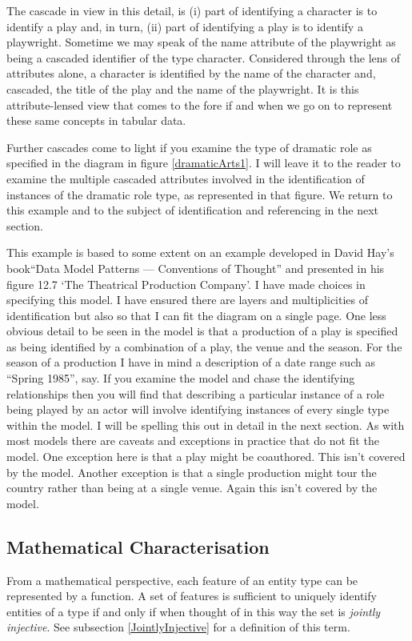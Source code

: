 The cascade in view in this detail, is 
(i)  part of identifying a character is to identify a play and, in turn,
(ii) part of identifying a play is to identify a playwright. 
Sometime we may speak of the name attribute of the playwright as being a cascaded identifier of the type character. Considered through the lens of attributes alone, a character is identified by the name of the character and, 
cascaded, the title of the play and the name of the playwright.
It is this attribute-lensed view that comes to the fore if and when we go on to represent these same concepts in tabular data.  

Further cascades come to light if you examine the type of dramatic role 
as specified in the diagram in figure \ref{dramaticArts1}. I will leave it to the reader to examine the multiple cascaded attributes involved in the identification of instances of the dramatic role type, as represented in that figure. 
We return to this example and to the subject of identification and referencing in the next section.

{This example is based to some extent on an example developed 
in David Hay's book``Data Model Patterns --- Conventions of Thought''
and presented in his figure 12.7 `The Theatrical Production Company'.
I have made choices in specifying this model.
I have ensured there are layers and multiplicities of identification but also so that I can fit the diagram on a single page. 
One less obvious detail to be seen in the model is that a production of a play is specified as 
being identified by a combination of a play, the venue and the season.
For the season of a production I have in mind a description of a date range such as  ``Spring 1985'', say. 
If you examine the model and chase the identifying relationships
then you will find that describing a particular instance of a role being played by an actor will involve identifying
instances of every single type within the model. I will be spelling this out in detail in the next section.
As with most models there are caveats and exceptions in practice that do not fit the model. 
One exception here is that a play might be coauthored. This isn't covered by the model.
Another exception is that a single production might tour the country rather than being at a single venue. Again this isn't covered by the model. }

\subsection {Mathematical Characterisation}
\mynote From a mathematical perspective, 
each feature of an entity type can be represented by a function. A set of features is sufficient to uniquely identify entities of a type if and only if when thought  of in this way the set is \textit{jointly injective}.   
See subsection \ref{JointlyInjective} for a definition of this term.

